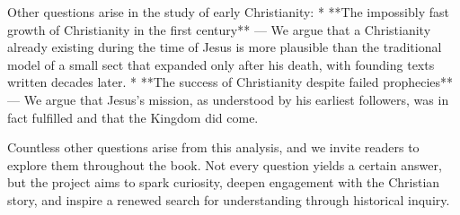 Other questions arise in the study of early Christianity:
* **The impossibly fast growth of Christianity in the first century** — We argue that a Christianity already existing during the time of Jesus is more plausible than the traditional model of a small sect that expanded only after his death, with founding texts written decades later.
* **The success of Christianity despite failed prophecies** — We argue that Jesus’s mission, as understood by his earliest followers, was in fact fulfilled and that the Kingdom did come.

Countless other questions arise from this analysis, and we invite readers to explore them throughout the book.
Not every question yields a certain answer, but the project aims to spark curiosity, deepen engagement with the Christian story, and inspire a renewed search for understanding through historical inquiry.
